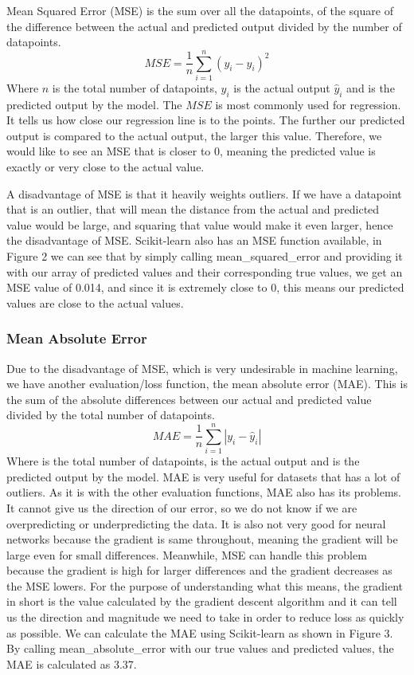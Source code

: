 \documentclass[a4paper,12pt]{report}
\begin{document}
Mean Squared Error (MSE) is the sum over all the datapoints, of the square of the difference between the actual and predicted output divided by the number of datapoints.
$$MSE=\frac{1}{n}\sum_{i=1}^n(y_i-\hat{y}_i)^2$$
Where $n$ is the total number of datapoints, $y_i$ is the actual output $\hat{y}_i$ and  is the predicted output by the model. The $MSE$ is most commonly used for regression. It tells us how close our regression line is to the points. The further our predicted output is compared to the actual output, the larger this value. Therefore, we would like to see an MSE that is closer to 0, meaning the predicted value is exactly or very close to the actual value.

A disadvantage of MSE is that it heavily weights outliers. If we have a datapoint that is an outlier, that will mean the distance from the actual and predicted value would be large, and squaring that value would make it even larger, hence the disadvantage of MSE. Scikit-learn also has an MSE function available, in Figure 2 we can see that by simply calling mean\_squared\_error and providing it with our array of predicted values and their corresponding true values, we get an MSE value of 0.014, and since it is extremely close to 0, this means our predicted values are close to the actual values.

 
\subsubsection{Mean Absolute Error}

Due to the disadvantage of MSE, which is very undesirable in machine learning, we have another evaluation/loss function, the mean absolute error (MAE). This is the sum of the absolute differences between our actual and predicted value divided by the total number of datapoints.
$$MAE=\frac{1}{n}\sum_{i=1}^n|y_i-\hat{y}_i|$$
Where  is the total number of datapoints,  is the actual output and  is the predicted output by the model. MAE is very useful for datasets that has a lot of outliers. As it is with the other evaluation functions, MAE also has its problems. It cannot give us the direction of our error, so we do not know if we are overpredicting or underpredicting the data. It is also not very good for neural networks because the gradient is same throughout, meaning the gradient will be large even for small differences. Meanwhile, MSE can handle this problem because the gradient is high for larger differences and the gradient decreases as the MSE lowers. For the purpose of understanding what this means, the gradient in short is the value calculated by the gradient descent algorithm and it can tell us the direction and magnitude we need to take in order to reduce loss as quickly as possible. We can calculate the MAE using Scikit-learn as shown in Figure 3. By calling mean\_absolute\_error with our true values and predicted values, the MAE is calculated as 3.37.
\end{document}
